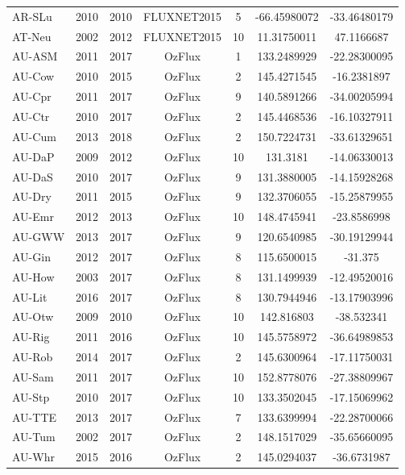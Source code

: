 \begin{center}
\begin{longtable}{lcccccc}
AR-SLu & 2010 & 2010 & FLUXNET2015 & 5      & -66.45980072 & -33.46480179 \\
AT-Neu & 2002 & 2012 & FLUXNET2015 & 10     & 11.31750011  & 47.1166687   \\
AU-ASM & 2011 & 2017 & OzFlux      & 1      & 133.2489929  & -22.28300095 \\
AU-Cow & 2010 & 2015 & OzFlux      & 2      & 145.4271545  & -16.2381897  \\
AU-Cpr & 2011 & 2017 & OzFlux      & 9      & 140.5891266  & -34.00205994 \\
AU-Ctr & 2010 & 2017 & OzFlux      & 2      & 145.4468536  & -16.10327911 \\
AU-Cum & 2013 & 2018 & OzFlux      & 2      & 150.7224731  & -33.61329651 \\
AU-DaP & 2009 & 2012 & OzFlux      & 10     & 131.3181     & -14.06330013 \\
AU-DaS & 2010 & 2017 & OzFlux      & 9      & 131.3880005  & -14.15928268 \\
AU-Dry & 2011 & 2015 & OzFlux      & 9      & 132.3706055  & -15.25879955 \\
AU-Emr & 2012 & 2013 & OzFlux      & 10     & 148.4745941  & -23.8586998  \\
AU-GWW & 2013 & 2017 & OzFlux      & 9      & 120.6540985  & -30.19129944 \\
AU-Gin & 2012 & 2017 & OzFlux      & 8      & 115.6500015  & -31.375      \\
AU-How & 2003 & 2017 & OzFlux      & 8      & 131.1499939  & -12.49520016 \\
AU-Lit & 2016 & 2017 & OzFlux      & 8      & 130.7944946  & -13.17903996 \\
AU-Otw & 2009 & 2010 & OzFlux      & 10     & 142.816803   & -38.532341   \\
AU-Rig & 2011 & 2016 & OzFlux      & 10     & 145.5758972  & -36.64989853 \\
AU-Rob & 2014 & 2017 & OzFlux      & 2      & 145.6300964  & -17.11750031 \\
AU-Sam & 2011 & 2017 & OzFlux      & 10     & 152.8778076  & -27.38809967 \\
AU-Stp & 2010 & 2017 & OzFlux      & 10     & 133.3502045  & -17.15069962 \\
AU-TTE & 2013 & 2017 & OzFlux      & 7      & 133.6399994  & -22.28700066 \\
AU-Tum & 2002 & 2017 & OzFlux      & 2      & 148.1517029  & -35.65660095 \\
AU-Whr & 2015 & 2016 & OzFlux      & 2      & 145.0294037  & -36.6731987  \\

\end{longtable}
\end{center}
